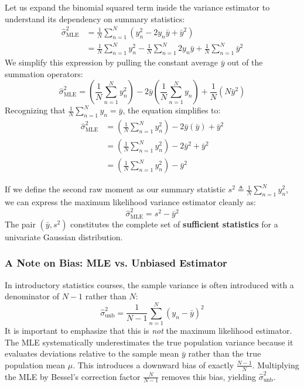 \documentclass{article}
\begin{document}
Let us expand the binomial squared term inside the variance estimator to understand its dependency on summary statistics:
\begin{align*}
\hat{\sigma}^2_{\text{MLE}} &= \frac{1}{N}\sum_{n=1}^N \left( y_n^2 - 2y_n\bar{y} + \bar{y}^2 \right) \\
&= \frac{1}{N}\sum_{n=1}^N y_n^2 - \frac{1}{N}\sum_{n=1}^N 2y_n\bar{y} + \frac{1}{N}\sum_{n=1}^N \bar{y}^2
\end{align*}
We simplify this expression by pulling the constant average $\bar{y}$ out of the summation operators:
\begin{equation}
\hat{\sigma}^2_{\text{MLE}} = \left(\frac{1}{N}\sum_{n=1}^N y_n^2\right) - 2\bar{y}\left(\frac{1}{N}\sum_{n=1}^N y_n\right) + \frac{1}{N}(N\bar{y}^2)
\end{equation}
Recognizing that $\frac{1}{N}\sum_{n=1}^N y_n = \bar{y}$, the equation simplifies to:
\begin{align*}
\hat{\sigma}^2_{\text{MLE}} &= \left(\frac{1}{N}\sum_{n=1}^N y_n^2\right) - 2\bar{y}(\bar{y}) + \bar{y}^2 \\
&= \left(\frac{1}{N}\sum_{n=1}^N y_n^2\right) - 2\bar{y}^2 + \bar{y}^2 \\
&= \left(\frac{1}{N}\sum_{n=1}^N y_n^2\right) - \bar{y}^2
\end{align*}

If we define the second raw moment as our summary statistic $s^2 \triangleq \frac{1}{N}\sum_{n=1}^N y_n^2$, we can express the maximum likelihood variance estimator cleanly as:
\begin{equation}
\hat{\sigma}^2_{\text{MLE}} = s^2 - \bar{y}^2
\end{equation}
The pair $(\bar{y}, s^2)$ constitutes the complete set of \textbf{sufficient statistics} for a univariate Gaussian distribution.

\subsubsection{A Note on Bias: MLE vs. Unbiased Estimator}
In introductory statistics courses, the sample variance is often introduced with a denominator of $N-1$ rather than $N$:
\begin{equation}
\hat{\sigma}^2_{\text{unb}} = \frac{1}{N-1}\sum_{n=1}^N (y_n - \bar{y})^2
\end{equation}
It is important to emphasize that this is \textit{not} the maximum likelihood estimator. The MLE systematically underestimates the true population variance because it evaluates deviations relative to the sample mean $\bar{y}$ rather than the true population mean $\mu$. This introduces a downward bias of exactly $\frac{N-1}{N}$. Multiplying the MLE by Bessel's correction factor $\frac{N}{N-1}$ removes this bias, yielding $\hat{\sigma}^2_{\text{unb}}$.
\end{document}
